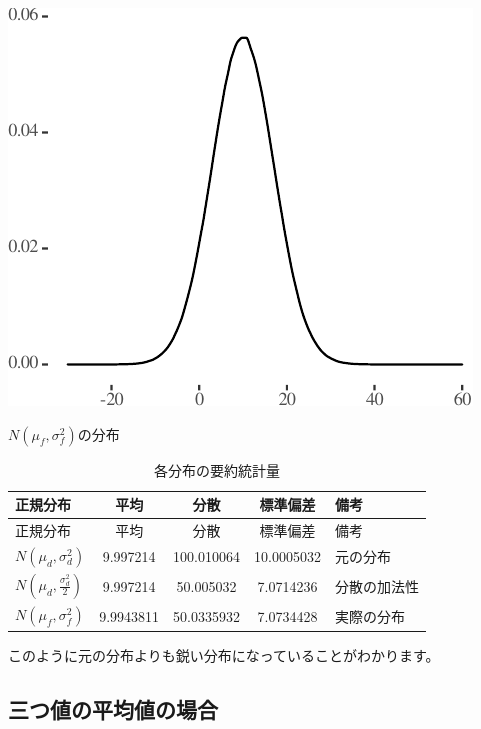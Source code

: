 \documentclass[]{tufte-handout}
\begin{document}
\begin{marginfigure}

{\centering \includegraphics{AdditivityOfVariance_files/figure-latex/unnamed-chunk-12-1} 

}

\caption[$N(\mu_f, \sigma^2_f)$の分布]{$N(\mu_f, \sigma^2_f)$の分布}\label{fig:unnamed-chunk-12}
\end{marginfigure}

\begin{longtable}[]{@{}lcccl@{}}
\caption{各分布の要約統計量}\tabularnewline
\toprule
正規分布 & 平均 & 分散 & 標準偏差 & 備考 \\
\midrule
\endfirsthead
\toprule
正規分布 & 平均 & 分散 & 標準偏差 & 備考 \\
\midrule
\endhead
\(N(\mu_d, \sigma^2_d)\) & 9.997214 & 100.010064 & 10.0005032 &
元の分布 \\
\(N(\mu_d, \frac{\sigma^2_d}{2})\) & 9.997214 & 50.005032 & 7.0714236 &
分散の加法性 \\
\(N(\mu_f, \sigma^2_f)\) & 9.9943811 & 50.0335932 & 7.0734428 &
実際の分布 \\
\bottomrule
\end{longtable}

このように元の分布よりも鋭い分布になっていることがわかります。

\newpage

\hypertarget{ux4e09ux3064ux5024ux306eux5e73ux5747ux5024ux306eux5834ux5408}{%
\subsection{\texorpdfstring{\textbf{三つ値の平均値の場合}}{三つ値の平均値の場合}}\label{ux4e09ux3064ux5024ux306eux5e73ux5747ux5024ux306eux5834ux5408}}
\end{document}
